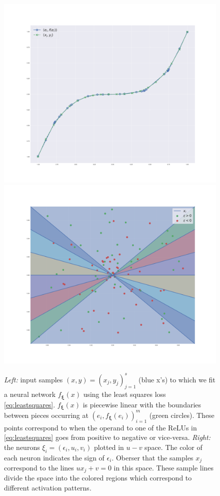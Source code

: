 \begin{figure}
    \centering
    \includegraphics[width=\textwidth]{figures/knots2.pdf}
    \endminipage\hfill
    \includegraphics[width=\textwidth]{figures/phaseplot_eg.pdf}
    \endminipage\hfill
    
    
    \caption{\textit{Left:} input samples $(x, y) = (x_j, y_j)_{j=1}^s$ (blue x's) to which we fit a neural network $f_{\bm \xi}(x)$ using the least squares loss \eqref{eq:leastsquares}. $f_{\bm \xi}(x)$ is piecewise linear with the boundaries between pieces occurring at $(e_i, f_{\bm \xi}(e_i))_{i=1}^m$ (green circles). These points correspond to when the operand to one of the ReLUs in \eqref{eq:leastsquares} goes from positive to negative or vice-versa. \textit{Right:} the neurons $\xi_i = (\epsilon_i, u_i, v_i)$ plotted in $u-v$ space. The color of each neuron indicates the sign of $\epsilon_i$. Oberser that the samples $x_j$ correspond to the lines $u x_j + v = 0$ in this space. These sample lines divide the space into the colored regions which correspond to different activation patterns.}
    \label{fig:knots}
\end{figure}



